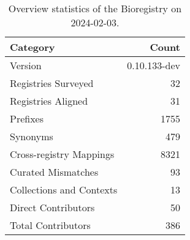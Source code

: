 \begin{table}
\caption{Overview statistics of the Bioregistry on 2024-02-03.}
\label{tab:bioregistry-summary}
\begin{tabular}{lr}
\toprule
Category & Count \\
\midrule
Version & 0.10.133-dev \\
Registries Surveyed & 32 \\
Registries Aligned & 31 \\
Prefixes & 1755 \\
Synonyms & 479 \\
Cross-registry Mappings & 8321 \\
Curated Mismatches & 93 \\
Collections and Contexts & 13 \\
Direct Contributors & 50 \\
Total Contributors & 386 \\
\bottomrule
\end{tabular}
\end{table}
